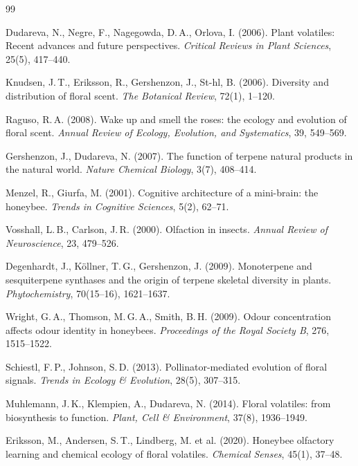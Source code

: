 ﻿\documentclass[12pt,a4paper]{article}
\begin{document}
\begin{thebibliography}{99}

 Dudareva, N., Negre, F., Nagegowda, D.\,A., Orlova, I. (2006). Plant volatiles: Recent advances and future perspectives. \textit{Critical Reviews in Plant Sciences}, 25(5), 417--440.

 Knudsen, J.\,T., Eriksson, R., Gershenzon, J., St-hl, B. (2006). Diversity and distribution of floral scent. \textit{The Botanical Review}, 72(1), 1--120.

 Raguso, R.\,A. (2008). Wake up and smell the roses: the ecology and evolution of floral scent. \textit{Annual Review of Ecology, Evolution, and Systematics}, 39, 549--569.

 Gershenzon, J., Dudareva, N. (2007). The function of terpene natural products in the natural world. \textit{Nature Chemical Biology}, 3(7), 408--414.

 Menzel, R., Giurfa, M. (2001). Cognitive architecture of a mini-brain: the honeybee. \textit{Trends in Cognitive Sciences}, 5(2), 62--71.

 Vosshall, L.\,B., Carlson, J.\,R. (2000). Olfaction in insects. \textit{Annual Review of Neuroscience}, 23, 479--526.

 Degenhardt, J., K\"ollner, T.\,G., Gershenzon, J. (2009). Monoterpene and sesquiterpene synthases and the origin of terpene skeletal diversity in plants. \textit{Phytochemistry}, 70(15--16), 1621--1637.

 Wright, G.\,A., Thomson, M.\,G.\,A., Smith, B.\,H. (2009). Odour concentration affects odour identity in honeybees. \textit{Proceedings of the Royal Society B}, 276, 1515--1522.

 Schiestl, F.\,P., Johnson, S.\,D. (2013). Pollinator-mediated evolution of floral signals. \textit{Trends in Ecology \& Evolution}, 28(5), 307--315.

 Muhlemann, J.\,K., Klempien, A., Dudareva, N. (2014). Floral volatiles: from biosynthesis to function. \textit{Plant, Cell \& Environment}, 37(8), 1936--1949.

 Eriksson, M., Andersen, S.\,T., Lindberg, M. et al. (2020). Honeybee olfactory learning and chemical ecology of floral volatiles. \textit{Chemical Senses}, 45(1), 37--48.

\end{thebibliography}
\end{document}
